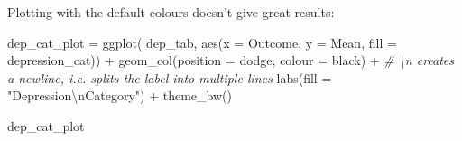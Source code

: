 \documentclass[
]{book}
\newenvironment{Shaded}{\begin{snugshade}}{\end{snugshade}}
\newcommand{\AttributeTok}[1]{\textcolor[rgb]{0.77,0.63,0.00}{#1}}
\newcommand{\CommentTok}[1]{\textcolor[rgb]{0.56,0.35,0.01}{\textit{#1}}}
\newcommand{\DecValTok}[1]{\textcolor[rgb]{0.00,0.00,0.81}{#1}}
\newcommand{\FunctionTok}[1]{\textcolor[rgb]{0.00,0.00,0.00}{#1}}
\newcommand{\NormalTok}[1]{#1}
\newcommand{\OtherTok}[1]{\textcolor[rgb]{0.56,0.35,0.01}{#1}}
\newcommand{\SpecialCharTok}[1]{\textcolor[rgb]{0.00,0.00,0.00}{#1}}
\newcommand{\StringTok}[1]{\textcolor[rgb]{0.31,0.60,0.02}{#1}}
\begin{document}
\begin{Shaded}
\end{Shaded}

Plotting with the default colours doesn't give great results:

\begin{Shaded}
\begin{Highlighting}[]
\NormalTok{dep\_cat\_plot }\OtherTok{=} \FunctionTok{ggplot}\NormalTok{(}
\NormalTok{    dep\_tab, }
    \FunctionTok{aes}\NormalTok{(}\AttributeTok{x =}\NormalTok{ Outcome, }\AttributeTok{y =}\NormalTok{ Mean, }\AttributeTok{fill =}\NormalTok{ depression\_cat)) }\SpecialCharTok{+}
    \FunctionTok{geom\_col}\NormalTok{(}\AttributeTok{position =} \StringTok{\textquotesingle{}dodge\textquotesingle{}}\NormalTok{, }\AttributeTok{colour =} \StringTok{\textquotesingle{}black\textquotesingle{}}\NormalTok{) }\SpecialCharTok{+}
    \CommentTok{\# \textbackslash{}n creates a newline, i.e. splits the label into multiple lines}
    \FunctionTok{labs}\NormalTok{(}\AttributeTok{fill =} \StringTok{"Depression}\SpecialCharTok{\textbackslash{}n}\StringTok{Category"}\NormalTok{) }\SpecialCharTok{+}
    \FunctionTok{theme\_bw}\NormalTok{()}

\NormalTok{dep\_cat\_plot}
\end{Highlighting}
\end{Shaded}
\end{document}
